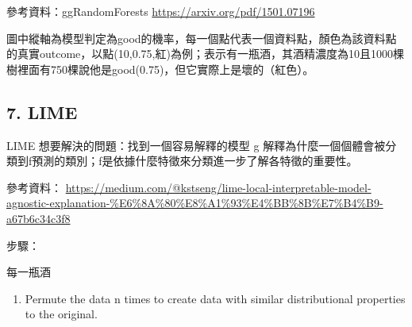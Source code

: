 \documentclass[]{book}
\newenvironment{Shaded}{\begin{snugshade}}{\end{snugshade}}
\newcommand{\KeywordTok}[1]{\textcolor[rgb]{0.13,0.29,0.53}{\textbf{#1}}}
\newcommand{\DataTypeTok}[1]{\textcolor[rgb]{0.13,0.29,0.53}{#1}}
\newcommand{\DecValTok}[1]{\textcolor[rgb]{0.00,0.00,0.81}{#1}}
\newcommand{\StringTok}[1]{\textcolor[rgb]{0.31,0.60,0.02}{#1}}
\newcommand{\CommentTok}[1]{\textcolor[rgb]{0.56,0.35,0.01}{\textit{#1}}}
\newcommand{\OtherTok}[1]{\textcolor[rgb]{0.56,0.35,0.01}{#1}}
\newcommand{\OperatorTok}[1]{\textcolor[rgb]{0.81,0.36,0.00}{\textbf{#1}}}
\newcommand{\NormalTok}[1]{#1}
\providecommand{\tightlist}{%
  \setlength{\itemsep}{0pt}\setlength{\parskip}{0pt}}
\begin{document}
參考資料：ggRandomForests \url{https://arxiv.org/pdf/1501.07196}

\begin{Shaded}
\end{Shaded}

圖中縱軸為模型判定為good的機率，每一個點代表一個資料點，顏色為該資料點的真實outcome，以點(10,0.75,紅)為例；表示有一瓶酒，其酒精濃度為10且1000棵樹裡面有750棵說他是good(0.75)，但它實際上是壞的（紅色）。

\hypertarget{lime-1}{%
\subsection{7. LIME}\label{lime-1}}

LIME 想要解決的問題：找到一個容易解釋的模型 g 解釋為什麼一個個體會被分類到f預測的類別；f是依據什麼特徵來分類進一步了解各特徵的重要性。

參考資料： \url{https://medium.com/@kstseng/lime-local-interpretable-model-agnostic-explanation-\%E6\%8A\%80\%E8\%A1\%93\%E4\%BB\%8B\%E7\%B4\%B9-a67b6c34c3f8}

步驟：

每一瓶酒

\begin{enumerate}
\def\labelenumi{\arabic{enumi}.}
\tightlist
\item
  Permute the data n times to create data with similar distributional properties to the original.
\end{enumerate}
\end{document}
